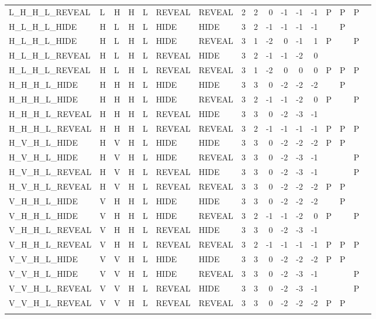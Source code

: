 \begin{longtable}{lllllllrrrrrrllll}
  L\_H\_H\_L\_REVEAL & L & H & H & L & REVEAL & REVEAL & 2 & 2 & 0 & -1 & -1 & -1 & P & P & P &  \\ 
  H\_L\_H\_L\_HIDE & H & L & H & L & HIDE & HIDE & 3 & 2 & -1 & -1 & -1 & -1 &  & P &  &  \\ 
  H\_L\_H\_L\_HIDE & H & L & H & L & HIDE & REVEAL & 3 & 1 & -2 & 0 & -1 & 1 & P &  & P &  \\ 
  H\_L\_H\_L\_REVEAL & H & L & H & L & REVEAL & HIDE & 3 & 2 & -1 & -1 & -2 & 0 &  &  &  &  \\ 
  H\_L\_H\_L\_REVEAL & H & L & H & L & REVEAL & REVEAL & 3 & 1 & -2 & 0 & 0 & 0 & P & P & P &  \\ 
  H\_H\_H\_L\_HIDE & H & H & H & L & HIDE & HIDE & 3 & 3 & 0 & -2 & -2 & -2 &  & P &  &  \\ 
  H\_H\_H\_L\_HIDE & H & H & H & L & HIDE & REVEAL & 3 & 2 & -1 & -1 & -2 & 0 & P &  & P &  \\ 
  H\_H\_H\_L\_REVEAL & H & H & H & L & REVEAL & HIDE & 3 & 3 & 0 & -2 & -3 & -1 &  &  &  &  \\ 
  H\_H\_H\_L\_REVEAL & H & H & H & L & REVEAL & REVEAL & 3 & 2 & -1 & -1 & -1 & -1 & P & P & P &  \\ 
  H\_V\_H\_L\_HIDE & H & V & H & L & HIDE & HIDE & 3 & 3 & 0 & -2 & -2 & -2 & P & P &  &  \\ 
  H\_V\_H\_L\_HIDE & H & V & H & L & HIDE & REVEAL & 3 & 3 & 0 & -2 & -3 & -1 &  &  & P &  \\ 
  H\_V\_H\_L\_REVEAL & H & V & H & L & REVEAL & HIDE & 3 & 3 & 0 & -2 & -3 & -1 &  &  & P &  \\ 
  H\_V\_H\_L\_REVEAL & H & V & H & L & REVEAL & REVEAL & 3 & 3 & 0 & -2 & -2 & -2 & P & P &  &  \\ 
  V\_H\_H\_L\_HIDE & V & H & H & L & HIDE & HIDE & 3 & 3 & 0 & -2 & -2 & -2 &  & P &  &  \\ 
  V\_H\_H\_L\_HIDE & V & H & H & L & HIDE & REVEAL & 3 & 2 & -1 & -1 & -2 & 0 & P &  & P &  \\ 
  V\_H\_H\_L\_REVEAL & V & H & H & L & REVEAL & HIDE & 3 & 3 & 0 & -2 & -3 & -1 &  &  &  &  \\ 
  V\_H\_H\_L\_REVEAL & V & H & H & L & REVEAL & REVEAL & 3 & 2 & -1 & -1 & -1 & -1 & P & P & P &  \\ 
  V\_V\_H\_L\_HIDE & V & V & H & L & HIDE & HIDE & 3 & 3 & 0 & -2 & -2 & -2 & P & P &  &  \\ 
  V\_V\_H\_L\_HIDE & V & V & H & L & HIDE & REVEAL & 3 & 3 & 0 & -2 & -3 & -1 &  &  & P &  \\ 
  V\_V\_H\_L\_REVEAL & V & V & H & L & REVEAL & HIDE & 3 & 3 & 0 & -2 & -3 & -1 &  &  & P &  \\ 
  V\_V\_H\_L\_REVEAL & V & V & H & L & REVEAL & REVEAL & 3 & 3 & 0 & -2 & -2 & -2 & P & P &  &  \\ 
   \hline
\hline
\label{truthtable}
\end{longtable}
\endgroup
